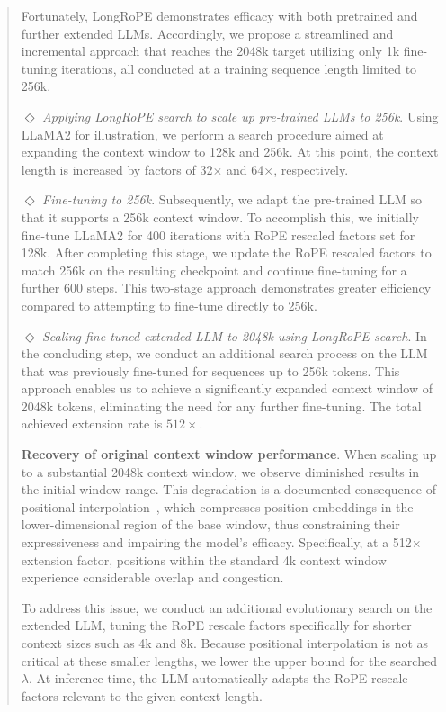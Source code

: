 \begin{abstract}
Fortunately, LongRoPE demonstrates efficacy with both pretrained and further extended LLMs. Accordingly, we propose a streamlined and incremental approach that reaches the 2048k target utilizing only 1k fine-tuning iterations, all conducted at a training sequence length limited to 256k.

$\Diamond$ \textit{Applying LongRoPE search to scale up pre-trained LLMs to 256k}. Using LLaMA2 for illustration, we perform a search procedure aimed at expanding the context window to 128k and 256k. At this point, the context length is increased by factors of 32$\times$ and 64$\times$, respectively.

$\Diamond$ \textit{Fine-tuning to 256k}. Subsequently, we adapt the pre-trained LLM so that it supports a 256k context window. To accomplish this, we initially fine-tune LLaMA2 for 400 iterations with RoPE rescaled factors set for 128k. After completing this stage, we update the RoPE rescaled factors to match 256k on the resulting checkpoint and continue fine-tuning for a further 600 steps. This two-stage approach demonstrates greater efficiency compared to attempting to fine-tune directly to 256k.

$\Diamond$ \textit{Scaling fine-tuned extended LLM to 2048k using LongRoPE search}. In the concluding step, we conduct an additional search process on the LLM that was previously fine-tuned for sequences up to 256k tokens. This approach enables us to achieve a significantly expanded context window of 2048k tokens, eliminating the need for any further fine-tuning. The total achieved extension rate is $512\times$.

\textbf{Recovery of original context window performance}. When scaling up to a substantial 2048k context window, we observe diminished results in the initial window range. This degradation is a documented consequence of positional interpolation~\cite{pi}, which compresses position embeddings in the lower-dimensional region of the base window, thus constraining their expressiveness and impairing the model's efficacy. Specifically, at a 512$\times$ extension factor, positions within the standard 4k context window experience considerable overlap and congestion.

To address this issue, we conduct an additional evolutionary search on the extended LLM, tuning the RoPE rescale factors specifically for shorter context sizes such as 4k and 8k. Because positional interpolation is not as critical at these smaller lengths, we lower the upper bound for the searched $\lambda$. At inference time, the LLM automatically adapts the RoPE rescale factors relevant to the given context length.


\end{abstract}

